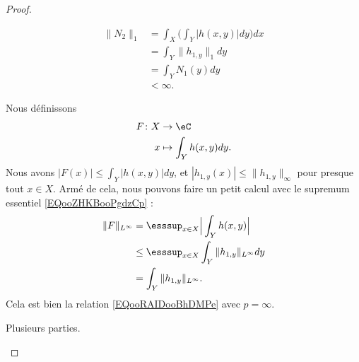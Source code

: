 \begin{proof}
\begin{subproof}
\begin{subproof}
\begin{subequations}
\begin{align}
					\| N_2 \|_1 & =\int_X\Big( \int_Y| h(x,y) |dy \Big)dx \\
					            & =\int_Y\| h_{1,y} \|_1dy                \\
					            & =\int_YN_1(y)dy                         \\
					            & <\infty.
				\end{align}
			\end{subequations}
		\end{subproof}
		\spitem[Pour \( p=\infty\)]
		Nous définissons
		\begin{equation}
			\begin{aligned}
				F\colon X & \to \eC                  \\
				x         & \mapsto \int_Y h(x,y)dy.
			\end{aligned}
		\end{equation}
		Nous avons \( \big| F(x) \big|\leq \int_Y| h(x,y) |dy\), et \( | h_{1,y}(x) |\leq \| h_{1,y} \|_{\infty}\) pour presque tout \( x\in X\). Armé de cela, nous pouvons faire un petit calcul avec le supremum essentiel \eqref{EQooZHKBooPgdzCp} :
		\begin{subequations}
			\begin{align}
				\| F \|_{L^{\infty}} & = \esssup_{x\in X}\Big| \int_Yh(x,y)   \Big|            \\
				                     & \leq \esssup_{x\in X}\int_Y\| h_{1,y} \|_{L^{\infty}}dy \\
				                     & =\int_Y\| h_{1,y} \|_{L^{\infty}}.
			\end{align}
		\end{subequations}
		Cela est bien la relation \eqref{EQooRAIDooBhDMPe} avec \( p=\infty\).

		\spitem[Si \( 1<p<\infty\)]
		Plusieurs parties.
		\begin{subproof}


\end{subproof}
\end{subproof}
\end{proof}
